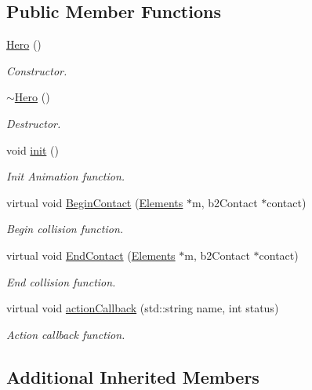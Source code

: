 \subsection*{Public Member Functions}
\begin{DoxyCompactItemize}
\item 
\hyperlink{class_hero_ab5920677a4b5cb59d6f513922d037dca}{Hero} ()
\begin{DoxyCompactList}\small\item\em Constructor. \end{DoxyCompactList}\item 
\hyperlink{class_hero_a5aeef41ede5a80dc29c5acd7b553c4da}{$\sim$\+Hero} ()
\begin{DoxyCompactList}\small\item\em Destructor. \end{DoxyCompactList}\item 
void \hyperlink{class_hero_ae67cc4b7770083755895b78664d0ea34}{init} ()
\begin{DoxyCompactList}\small\item\em Init Animation function. \end{DoxyCompactList}\item 
virtual void \hyperlink{class_hero_ac23c090d8f5e2768b4175580a0d53d1b}{Begin\+Contact} (\hyperlink{class_elements}{Elements} $\ast$m, b2\+Contact $\ast$contact)
\begin{DoxyCompactList}\small\item\em Begin collision function. \end{DoxyCompactList}\item 
virtual void \hyperlink{class_hero_a9fee92d1b0df478f95bc10ba84015d2a}{End\+Contact} (\hyperlink{class_elements}{Elements} $\ast$m, b2\+Contact $\ast$contact)
\begin{DoxyCompactList}\small\item\em End collision function. \end{DoxyCompactList}\item 
virtual void \hyperlink{class_hero_aa41ef53abd25057ceb431811ccf80ad5}{action\+Callback} (std\+::string name, int status)
\begin{DoxyCompactList}\small\item\em Action callback function. \end{DoxyCompactList}\end{DoxyCompactItemize}
\subsection*{Additional Inherited Members}


